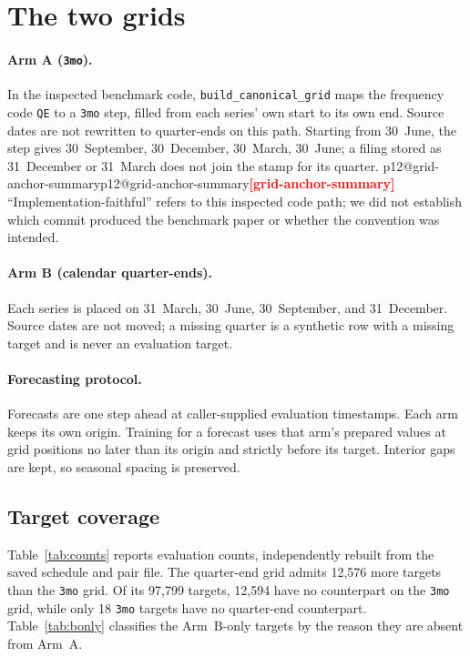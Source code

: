 \documentclass[11pt]{article}
\makeatletter
\newcommand{\val}[1]{\ifcsname p12@#1\endcsname\csname p12@#1\endcsname\else\textcolor{red}{\textbf{[#1]}}\fi}
\makeatother
\begin{document}
\section{The two grids}\label{sec:grids}
\paragraph{Arm A (\texttt{3mo}).} In the inspected benchmark code, \texttt{build\_canonical\_grid} maps the frequency code \texttt{QE} to a \texttt{3mo} step, filled from each series' own start to its own end. Source dates are not rewritten to quarter-ends on this path. Starting from 30~June, the step gives 30~September, 30~December, 30~March, 30~June; a filing stored as 31~December or 31~March does not join the stamp for its quarter. \val{grid-anchor-summary} ``Implementation-faithful'' refers to this inspected code path; we did not establish which commit produced the benchmark paper or whether the convention was intended.

\paragraph{Arm B (calendar quarter-ends).} Each series is placed on 31~March, 30~June, 30~September, and 31~December. Source dates are not moved; a missing quarter is a synthetic row with a missing target and is never an evaluation target.

\paragraph{Forecasting protocol.} Forecasts are one step ahead at caller-supplied evaluation timestamps. Each arm keeps its own origin. Training for a forecast uses that arm's prepared values at grid positions no later than its origin and strictly before its target. Interior gaps are kept, so seasonal spacing is preserved.

\subsection{Target coverage}\label{sec:coverage}
Table~\ref{tab:counts} reports evaluation counts, independently rebuilt from the saved schedule and pair file. The quarter-end grid admits 12,576 more targets than the \texttt{3mo} grid. Of its 97,799 targets, 12,594 have no counterpart on the \texttt{3mo} grid, while only 18 \texttt{3mo} targets have no quarter-end counterpart. Table~\ref{tab:bonly} classifies the Arm~B-only targets by the reason they are absent from Arm~A.
\end{document}
